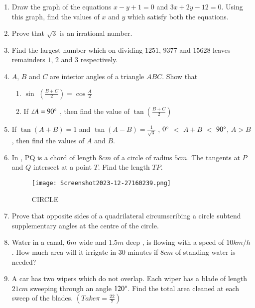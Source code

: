 \documentclass[2pt,-letter paper]{article}
\providecommand{\brak}[1]{\ensuremath{\left(#1\right)}}
\begin{document}
\begin{enumerate}
\item Draw the graph of the equations $x - y + 1 = 0$ and $3x + 2y - 12 = 0$. Using this graph, find the values of $x$ and $y$ which satisfy both the equations.

\item Prove that $\sqrt{3}$ is an irrational number.

\item Find the largest number which on dividing $1251$, $9377$ and $15628$ leaves remainders $1$, $2$ and $3$ respectively.

\item $A$, $B$ and $C$ are interior angles of a triangle $ABC$. Show that\\
\begin{enumerate}
\item  $\sin$ $ \brak{{\frac {B+C}{2}}} = \cos {\frac {A}{2}}$\\
\item  If $\angle A = 90 \degree$ , then find the value of $\tan \brak{{\frac{B+C}{2}}}$ 
\end{enumerate} 

\item If $\tan \brak{A + B} = 1$ and $\tan \brak{A - B} = \frac{1}{\sqrt{3}}$ , $0\degree$ $<$ $A + B$ $<$ $90\degree$, $A > B$, then find the values of $A$ and $B$.

\item In , PQ is a chord of length $8 cm$ of a circle of radius $5 cm$. The tangents at $P$ and $Q$ intersect at a point $T$. Find the length $TP$.
\begin{figure}[H]
    \centering
    \texttt{[image: Screenshot2023-12-27160239.png]}
    \caption{CIRCLE}
    \label{fig:Fig_2}
\end{figure}


\item Prove that opposite sides of a quadrilateral circumscribing a circle subtend supplementary angles at the centre of the circle.

\item Water in a canal, $6 m$ wide and $1.5 m$ deep , is flowing with a speed of $10 km/h$. How much area will it irrigate in $30$ minutes if $8 cm$ of standing water is needed?


\item A car has two wipers which do not overlap. Each wiper has a blade of
length $21 cm$ sweeping through an angle $120\degree$. Find the total area cleaned at each sweep of the blades. $(Take  \pi=\frac{22}{7})$


\end{enumerate}
\end{document}
